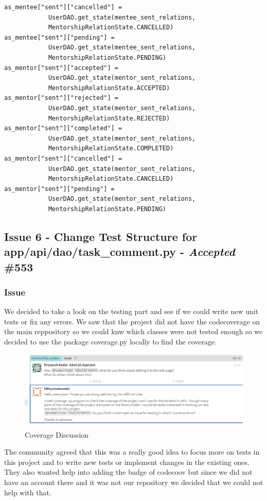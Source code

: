 \documentclass{article}
\begin{document}
\begin{lstlisting}
as_mentee["sent"]["cancelled"] = 
            UserDAO.get_state(mentee_sent_relations, 
            MentorshipRelationState.CANCELLED)
as_mentee["sent"]["pending"] = 
            UserDAO.get_state(mentee_sent_relations, 
            MentorshipRelationState.PENDING)
as_mentor["sent"]["accepted"] = 
            UserDAO.get_state(mentor_sent_relations, 
            MentorshipRelationState.ACCEPTED)
as_mentor["sent"]["rejected"] = 
            UserDAO.get_state(mentor_sent_relations, 
            MentorshipRelationState.REJECTED)
as_mentor["sent"]["completed"] = 
            UserDAO.get_state(mentor_sent_relations, 
            MentorshipRelationState.COMPLETED)
as_mentor["sent"]["cancelled"] = 
            UserDAO.get_state(mentor_sent_relations, 
            MentorshipRelationState.CANCELLED)
as_mentor["sent"]["pending"] = 
            UserDAO.get_state(mentor_sent_relations, 
            MentorshipRelationState.PENDING)
\end{lstlisting}

\subsection{Issue 6 - Change Test Structure for app/api/dao/task\_comment.py - \emph{Accepted} \#553}
\subsubsection{Issue}
\hspace{0.5cm}We decided to take a look on the testing part and see if we could write new unit tests or fix any errors. We saw that the project did not have the codecoverage on the main reppository so we could knw which classes were not tested enough so we decided to use the package coverage.py locally to find the coverage.
\begin{figure}[tph!]
\centerline{\includegraphics[totalheight=7cm, width=15cm]{testing-coverage.png}}
    \caption{Coverage Discussion}
    \label{fig:verticalcell}
\end{figure}
\vfill
\clearpage
\hspace{0.5cm}The community agreed that this was a really good idea to focus more on tests in this project and to write new tests or implement changes in the existing ones. They also wanted help into adding the badge of codecoov but since we did not have an account there and it was not our repository we decided that we could not help with that.
\end{document}
